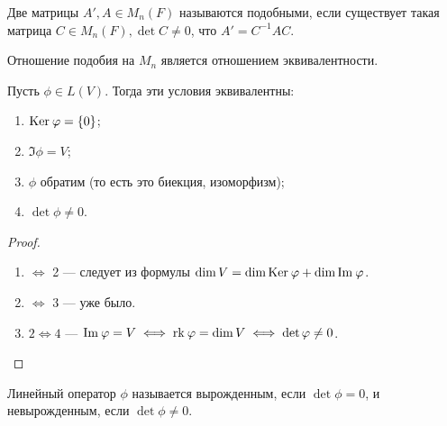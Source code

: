 \begin{Def}
    Две матрицы $A', A \in M_n(F)$ называются подобными, если существует такая матрица $C \in M_n(F), \det C \neq 0$, что $A' = C^{-1}AC$.
\end{Def}

\begin{Note}
    Отношение подобия на $M_n$ является отношением эквивалентности. 
\end{Note}

\begin{Suggestion}
    Пусть $\phi \in L(V)$. Тогда эти условия эквивалентны:
    \begin{enumerate}
        \item $\mathrm{Ker}\:\varphi = \{0\}$;
        \item $\Im \phi = V$;
        \item $\phi$ обратим (то есть это биекция, изоморфизм);
        \item $\det \phi \neq 0$.
    \end{enumerate}
\end{Suggestion}

\begin{proof}\ 
    \begin{enumerate}
        \item $\Leftrightarrow$ 2 --- следует из формулы $\dim V = \dim \mathrm{Ker}\: \varphi + \dim \mathrm{Im\:} \varphi$.
        \item $\Leftrightarrow$ 3 --- уже было.
        \item $2 \Leftrightarrow 4$ --- $\mathrm{Im\:} \varphi = V \iff \mathrm{rk}\: \varphi = \dim V \iff \det \varphi \ne 0$.
    \end{enumerate}
\end{proof}

\begin{Def}
    Линейный оператор $\phi$ называется вырожденным, если $\det \phi = 0$, и невырожденным, если $\det \phi \neq 0$.
\end{Def}
